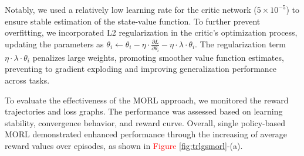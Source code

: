 \documentclass[preprint,12pt]{elsarticle}
\begin{document}
\begin{table}[h]
    \centering
    \caption{Best hyperparameter settings for actor and critic learning}
    \label{table:hps}
    {\small  %
    }
\end{table}

Notably, we used a relatively low learning rate for the critic network ($5\times10^{-5}$) to ensure stable estimation of the state-value function. To further prevent overfitting, we incorporated L2 regularization in the critic's optimization process, updating the parameters as $\theta_{i} \gets \theta_{i} - \eta\cdot \frac{\partial L}{\partial \theta_{i}} - \eta\cdot\lambda\cdot\theta_{i}$. The regularization term $\eta\cdot\lambda\cdot\theta_{i}$ penalizes large weights, promoting smoother value function estimates, preventing to gradient exploding and improving generalization performance across tasks. 

\vspace{0.5pt}

To evaluate the effectiveness of the MORL approach, we monitored the reward trajectories and loss graphs. The performance was assessed based on learning stability, convergence behavior, and reward curve. Overall, single policy-based MORL demonstrated enhanced performance through the increasing of average reward values over episodes, as shown in \textcolor{red}{Figure} \ref{fig:trlgsmorl}-(a). 
\end{document}
